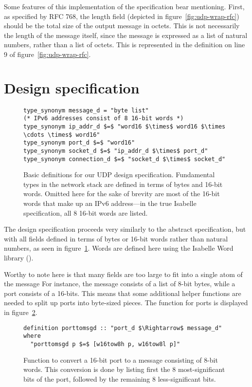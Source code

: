 \documentclass[twoside]{memoir}
\begin{document}
Some features of this implementation of the specification bear mentioning.
First, as specified by RFC 768, the length field (depicted in figure~\ref{fig:udp-wrap-rfc}) should be the total size of the output message in octets.
This is not necessarily the length of the message itself,
since the message is expressed as a list of natural numbers, rather than
a list of octets.
This is represented in the definition on line 9 of figure~\ref{fig:udp-wrap-rfc}.



\section{Design specification}

\begin{figure}[htpb]
    \centering
\begin{lstlisting}[language=isabelle]
type_synonym message_d = "byte list"
(* IPv6 addresses consist of 8 16-bit words *)
type_synonym ip_addr_d $=$ "word16 $\times$ word16 $\times \cdots \times$ word16"
type_synonym port_d $=$ "word16"
type_synonym socket_d $=$ "ip_addr_d $\times$ port_d"
type_synonym connection_d $=$ "socket_d $\times$ socket_d"
\end{lstlisting}
    \caption{Basic definitions for our UDP design specification.
    Fundamental types in the network stack are defined
    in terms of bytes and 16-bit words.
    Omitted here for the sake of brevity are most of the 16-bit words
    that make up an IPv6 address---in the true Isabelle specification,
    all 8 16-bit words are listed.}
    \label{fig:defs-design}
\end{figure}

The design specification proceeds very similarly to the abstract specification,
but with all fields defined in terms of bytes or 16-bit words rather than
natural numbers, as seen in figure~\ref{fig:defs-design}.
Words are defined here using the Isabelle Word library
(\cite{Word_Lib-AFP}).

Worthy to note here is that many fields are too large to fit into
a single atom of the message
For instance, the message consists of a list of
8-bit bytes, while a port consists of a 16-bits.
This means that some additional helper functions are needed
to split up ports into byte-sized pieces.
The function for ports is displayed in figure~\ref{fig:porttomsg-design}.

\begin{figure}[htpb]
    \centering
\begin{lstlisting}[language=isabelle]
definition porttomsgd :: "port_d $\Rightarrow$ message_d" where
  "porttomsgd p $=$ [w16tow8h p, w16tow8l p]"
\end{lstlisting}
    \caption{Function to convert a 16-bit port to a message
        consisting of 8-bit words.
        This conversion is done by listing first the 8
        most-significant bits of the port, followed by
        the remaining 8 less-significant bits.}
    \label{fig:porttomsg-design}
\end{figure}
\end{document}
